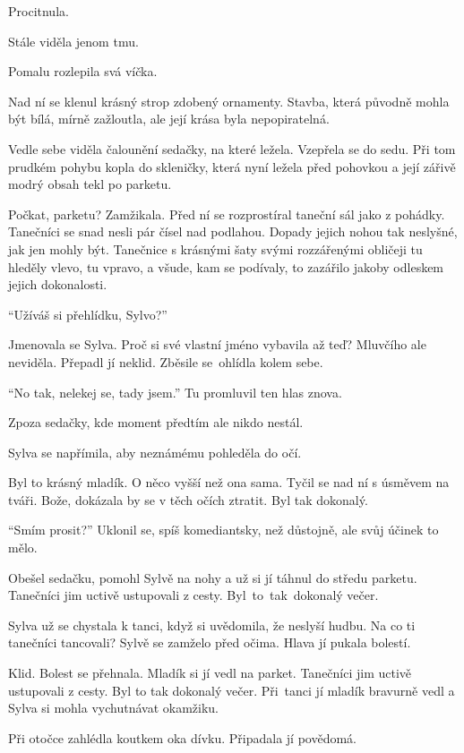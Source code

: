 \documentclass[10pt]{article}
\begin{document}
\begin{spacing}{1}
	Procitnula.\par
	Stále viděla jenom tmu.\par
	Pomalu rozlepila svá víčka.\par
	Nad ní se klenul krásný strop zdobený ornamenty.
	Stavba, která původně mohla být bílá, mírně zažloutla, ale její krása byla nepopiratelná.\par
	Vedle sebe viděla čalounění sedačky, na které ležela.
	Vzepřela se do sedu.
	Při tom prudkém pohybu kopla do skleničky, která nyní ležela před pohovkou a její zářivě modrý obsah tekl po parketu.\par
	Počkat, parketu?
	Zamžikala.
	Před ní se rozprostíral taneční sál jako z pohádky.
	Tanečníci se snad nesli pár čísel nad podlahou.
	Dopady jejich nohou tak neslyšné, jak jen mohly být.
	Tanečnice s krásnými šaty svými rozzářenými obličeji tu hleděly vlevo, tu vpravo, a všude, kam se podívaly, to zazářilo jakoby odleskem jejich dokonalosti.\par
	\enquote{Užíváš si přehlídku, Sylvo?}\par
	Jmenovala se Sylva.
	Proč si své vlastní jméno vybavila až teď?
	Mluvčího ale neviděla.
	Přepadl jí neklid.
	Zběsile se~ohlídla kolem sebe.\par
	\enquote{No tak, nelekej se, tady jsem.} Tu promluvil ten hlas znova.\par
	Zpoza sedačky, kde moment předtím ale nikdo nestál.\par
	Sylva se napřímila, aby neznámému pohleděla do očí.\par
	Byl to krásný mladík.
	O něco vyšší než ona sama.
	Tyčil se nad ní s úsměvem na tváři.
	Bože, dokázala by se v těch očích ztratit.
	Byl tak dokonalý.\par
	\enquote{Smím prosit?} Uklonil se, spíš komediantsky, než důstojně, ale svůj účinek to mělo.\par
	Obešel sedačku, pomohl Sylvě na nohy a už si jí táhnul do středu parketu.
	Tanečníci jim uctivě ustupovali z cesty.
	Byl~to~tak~dokonalý večer.\par
	Sylva už se chystala k tanci, když si uvědomila, že neslyší hudbu.
	Na co ti tanečníci tancovali?
	Sylvě se zamželo před očima.
	Hlava jí pukala bolestí.\par
	Klid.
	Bolest se přehnala.
	Mladík si jí vedl na parket.
	Tanečníci jim uctivě ustupovali z cesty.
	Byl to tak dokonalý večer.
	Při~tanci jí mladík bravurně vedl a Sylva si mohla vychutnávat okamžiku.\par
	Při otočce zahlédla koutkem oka dívku.
	Připadala jí povědomá.

\end{spacing}
\end{document}
